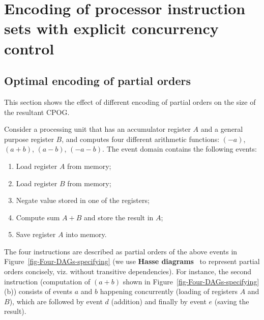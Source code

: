 \chapter{Encoding of processor instruction sets with explicit concurrency control}

\section{Optimal encoding of partial orders\label{sec:Optimal-encoding-problem}}

This section shows the effect of different encoding of partial orders
on the size of the resultant CPOG.

Consider a processing unit that has an accumulator register $A$ and
a general purpose register $B$, and computes four different arithmetic
functions: $(-a)$, $(a+b)$, $(a-b)$, $(-a-b)$. The event domain
contains the following events:

\renewcommand{\labelenumi}{\alph{enumi})}
\begin{enumerate}
\item Load register $A$ from memory;
\item Load register $B$ from memory;
\item Negate value stored in one of the registers;
\item Compute sum $A+B$ and store the result in $A$;
\item Save register $A$ into memory.
\end{enumerate}
The four instructions are described as partial orders of the above
events in Figure~\ref{fig-Four-DAGs-specifying} (we use \textbf{Hasse
diagrams}~\cite{1967_birkhoff_} to represent partial orders concisely,
viz. without transitive dependencies). For instance, the second instruction
(computation of $(a+b)$ shown in Figure~\ref{fig-Four-DAGs-specifying}(b))
consists of events $a$ and $b$ happening concurrently (loading of
registers $A$ and $B$), which are followed by event $d$ (addition)
and finally by event $e$ (saving the result).

